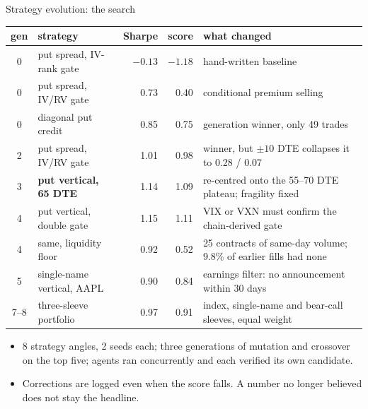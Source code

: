 \documentclass[aspectratio=169,10pt]{beamer}
\newcommand{\muted}[1]{{\color{muted}#1}}
\begin{document}
\begin{frame}{Strategy evolution: the search}
  \footnotesize
  \begin{tabular}{@{}cL{4.1cm}rrL{6.6cm}@{}}
    \toprule
    gen & strategy & Sharpe & score & what changed \\
     & put spread, IV-rank gate & $-0.13$ & $-1.18$ & hand-written baseline \\
    0 & put spread, IV/RV gate & 0.73 & 0.40 & conditional premium selling \\
    0 & diagonal put credit & 0.85 & 0.75 & generation winner, only 49 trades \\
    2 & put spread, IV/RV gate & 1.01 & 0.98 & winner, but $\pm10$ DTE collapses it to 0.28 / 0.07 \\
    3 & \textbf{put vertical, 65 DTE} & 1.14 & 1.09 & re-centred onto the 55--70 DTE plateau; fragility fixed \\
    4 & put vertical, double gate & 1.15 & 1.11 & VIX or VXN must confirm the chain-derived gate \\
    4 & \muted{same, liquidity floor} & \muted{0.92} & \muted{0.52} & \muted{25 contracts of same-day volume; 9.8\% of earlier fills had none} \\
    5 & single-name vertical, AAPL & 0.90 & 0.84 & earnings filter: no announcement within 30 days \\
    7--8 & three-sleeve portfolio & 0.97 & 0.91 & index, single-name and bear-call sleeves, equal weight \\
    \bottomrule
  \end{tabular}
  \vspace{0.7em}
  \normalsize
  \begin{itemize}
    \item 8 strategy angles, 2 seeds each; three generations of mutation and crossover on the top five; agents ran
          concurrently and each verified its own candidate.
    \item Corrections are logged even when the score falls. A number no longer believed does not stay the headline.
  \end{itemize}
\end{frame}
\end{document}
